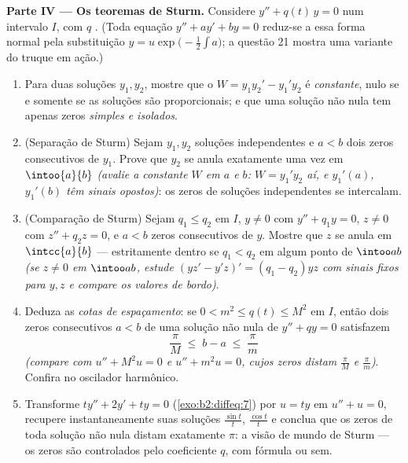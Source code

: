 \begin{problem}
\medskip
\noindent\textbf{Parte IV --- Os teoremas de Sturm.} Considere $y''
+ q(t)\,y = 0$ num intervalo $I$, com $q$ . (Toda
equação $y'' + ay' + by = 0$ reduz-se a essa forma normal pela
substituição $y = u\exp\bigl(-\frac12\int a\bigr)$;
a questão 21 mostra uma variante do truque em ação.)
\begin{enumerate}[resume]
  \item Para duas soluções $y_1, y_2$, mostre que o 
        $W = y_1y_2' - y_1'y_2$ é \emph{constante}, nulo se e somente se
        as soluções são proporcionais; e que uma solução não nula
        tem apenas zeros \emph{simples e isolados}.
  \item (Separação de Sturm) Sejam $y_1, y_2$ soluções independentes
        e $a < b$ dois zeros consecutivos de $y_1$.
        Prove que $y_2$ se anula exatamente uma vez em
        $\intoo{a}{b}$ \emph{(avalie a constante $W$ em $a$
        e $b$: $W = y_1'y_2$ aí, e $y_1'(a)$,
        $y_1'(b)$ têm sinais opostos)}: os zeros de soluções
        independentes se intercalam.
  \item (Comparação de Sturm) Sejam $q_1 \leq q_2$ em $I$, $y \neq
        0$ com $y'' + q_1y = 0$, $z \neq 0$ com $z'' + q_2z
        = 0$, e $a < b$ zeros consecutivos de $y$. Mostre que
        $z$ se anula em $\intcc{a}{b}$ --- estritamente dentro se
        $q_1 < q_2$ em algum ponto de $\intoo ab$ \emph{(se $z \neq
        0$ em $\intoo ab$, estude $(yz' - y'z)' = (q_1 -
        q_2)yz$ com sinais fixos para $y, z$ e compare os
        valores de bordo)}.
  \item Deduza as \emph{cotas de espaçamento}: se $0 < m^2 \leq
        q(t) \leq M^2$ em $I$, então dois zeros consecutivos
        $a < b$ de uma solução não nula de $y'' + qy = 0$
        satisfazem
        \[
        \frac{\pi}{M} \;\leq\; b - a \;\leq\; \frac{\pi}{m}
        \]
        \emph{(compare com $u'' + M^2u = 0$ e $u'' + m^2u
        = 0$, cujos zeros distam $\frac\pi M$ e
        $\frac\pi m$)}. Confira no oscilador harmônico.
  \item Transforme $ty'' + 2y' + ty = 0$
        (\cref{exo:b2:diffeq:7}) por $u = ty$ em $u'' + u =
        0$, recupere instantaneamente suas soluções $\frac{\sin t}t$,
        $\frac{\cos t}{t}$ e conclua que os
        zeros de toda solução não nula distam exatamente
        $\pi$: a visão de mundo de Sturm --- os zeros são controlados pelo
        coeficiente $q$, com fórmula ou sem.
\end{enumerate}


\end{problem}
